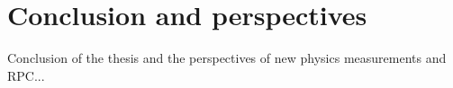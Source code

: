 \chapter{Conclusion and perspectives}

Conclusion of the thesis and the perspectives of new physics measurements and RPC...

